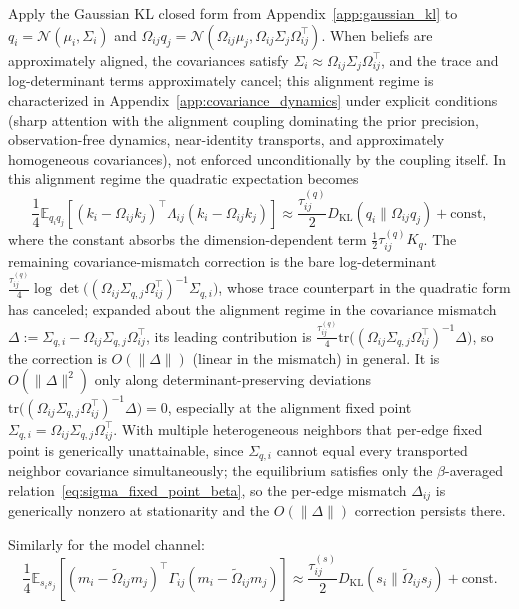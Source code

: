 \documentclass[11pt]{article}
\begin{document}
Apply the Gaussian KL closed form from Appendix~\ref{app:gaussian_kl} to $q_i = \mathcal{N}(\mu_i,\Sigma_i)$ and $\Omega_{ij}q_j = \mathcal{N}(\Omega_{ij}\mu_j, \Omega_{ij}\Sigma_j\Omega_{ij}^\top)$. When beliefs are approximately aligned, the covariances satisfy $\Sigma_i \approx \Omega_{ij}\Sigma_j\Omega_{ij}^\top$, and the trace and log-determinant terms approximately cancel; this alignment regime is characterized in Appendix~\ref{app:covariance_dynamics} under explicit conditions (sharp attention with the alignment coupling dominating the prior precision, observation-free dynamics, near-identity transports, and approximately homogeneous covariances), not enforced unconditionally by the coupling itself. In this alignment regime the quadratic expectation becomes
\begin{equation}
\frac{1}{4}\mathbb{E}_{q_i q_j}
[(k_i-\Omega_{ij}k_j)^\top\Lambda_{ij}(k_i-\Omega_{ij}k_j)]
\approx
\frac{\tau^{(q)}_{ij}}{2}D_{\mathrm{KL}}(q_i\|\Omega_{ij}q_j)+\text{const},
\end{equation}
where the constant absorbs the dimension-dependent term $\tfrac{1}{2}\tau^{(q)}_{ij}K_q$. The remaining covariance-mismatch correction is the bare log-determinant $\tfrac{\tau^{(q)}_{ij}}{4}\log\det\big((\Omega_{ij}\Sigma_{q,j}\Omega_{ij}^\top)^{-1}\Sigma_{q,i}\big)$, whose trace counterpart in the quadratic form has canceled; expanded about the alignment regime in the covariance mismatch $\Delta := \Sigma_{q,i} - \Omega_{ij}\Sigma_{q,j}\Omega_{ij}^\top$, its leading contribution is $\tfrac{\tau^{(q)}_{ij}}{4}\mathrm{tr}\big((\Omega_{ij}\Sigma_{q,j}\Omega_{ij}^\top)^{-1}\Delta\big)$, so the correction is $O(\|\Delta\|)$ (linear in the mismatch) in general. It is $O(\|\Delta\|^2)$ only along determinant-preserving deviations $\mathrm{tr}\big((\Omega_{ij}\Sigma_{q,j}\Omega_{ij}^\top)^{-1}\Delta\big)=0$, especially at the alignment fixed point $\Sigma_{q,i}=\Omega_{ij}\Sigma_{q,j}\Omega_{ij}^\top$. With multiple heterogeneous neighbors that per-edge fixed point is generically unattainable, since $\Sigma_{q,i}$ cannot equal every transported neighbor covariance simultaneously; the equilibrium satisfies only the $\beta$-averaged relation~\eqref{eq:sigma_fixed_point_beta}, so the per-edge mismatch $\Delta_{ij}$ is generically nonzero at stationarity and the $O(\|\Delta\|)$ correction persists there.

Similarly for the model channel:
\begin{equation}
\frac{1}{4}\mathbb{E}_{s_i s_j}
[(m_i-\tilde{\Omega}_{ij}m_j)^\top\Gamma_{ij}(m_i-\tilde{\Omega}_{ij}m_j)]
\approx
\frac{\tau^{(s)}_{ij}}{2}D_{\mathrm{KL}}(s_i\|\tilde{\Omega}_{ij}s_j)+\text{const}.
\end{equation}
\end{document}
